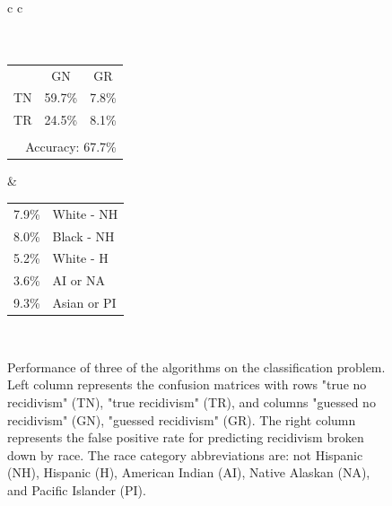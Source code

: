\documentclass[sigconf]{acmart}
\begin{document}
\begin{figure}
  \begin{tabular}{c c}
    \vspace{3mm} \\
     \\
    \vspace{-2mm} \\
    \begin{tabular}{c c c}
      & GN & GR \\ \cline{2-3}
      TN & \multicolumn{1}{|c|}{59.7\%} & \multicolumn{1}{|c|}{7.8\%} \\ \cline{2-3}
      TR & \multicolumn{1}{|c|}{24.5\%} & \multicolumn{1}{|c|}{8.1\%} \\ \cline{2-3}
       & & \vspace{-2mm} \\
      \multicolumn{3}{r}{Accuracy: 67.7\%} \\
    \end{tabular} & 
    \begin{tabular}{|c l|}
      \hline
      7.9\% & White - NH \\
      8.0\% & Black - NH \\
      5.2\% & White - H \\
      3.6\% & AI or NA \\
      9.3\% & Asian or PI \\
      \hline
    \end{tabular} \\
  \end{tabular}
  \vspace{3mm}
  \caption{Performance of three of the algorithms on the classification problem. Left column represents the confusion matrices with rows "true no recidivism" (TN), "true recidivism" (TR), and columns "guessed no recidivism" (GN), "guessed recidivism" (GR). The right column represents the false positive rate for predicting recidivism broken down by race. The race category abbreviations are: not Hispanic (NH), Hispanic (H), American Indian (AI), Native Alaskan (NA), and Pacific Islander (PI).}
  \label{fig:classification_performance}
\end{figure}
\end{document}

